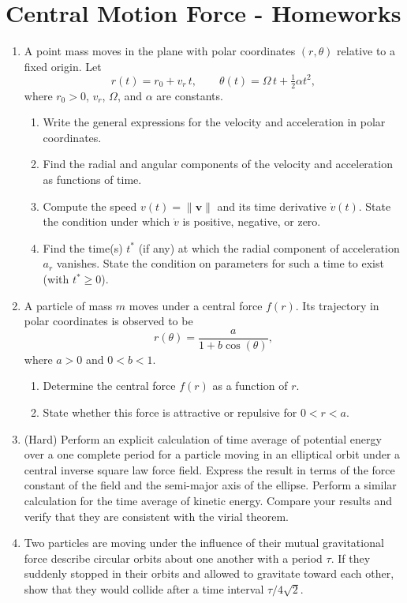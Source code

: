 \documentclass[../main.tex]{subfiles}
\begin{document}
\section{Central Motion Force - Homeworks}
\begin{enumerate}
\item A point mass moves in the plane with polar coordinates $(r,\theta)$ relative to a fixed origin. Let
\[
r(t)=r_0+v_r\,t,\qquad \theta(t)=\Omega\,t+\tfrac{1}{2}\alpha t^2,
\]
where \(r_0>0\), \(v_r\), \(\Omega\), and \(\alpha\) are constants. 

\begin{enumerate}
  \item[(a)] Write the general expressions for the velocity and acceleration in polar coordinates.
  \item[(b)] Find the radial and angular components of the velocity and acceleration as functions of time.
  \item[(c)] Compute the speed \(v(t)=\|\mathbf v\|\) and its time derivative \(\dot v(t)\). State the condition under which \(\dot v\) is positive, negative, or zero.

  \item[(d)] Find the time(s) \(t^\ast\) (if any) at which the radial component of acceleration \(a_r\) vanishes. State the condition on parameters for such a time to exist (with \(t^\ast\ge 0\)).
\end{enumerate}
\item     A particle of mass $m$ moves under a central force $f(r)$.  
    Its trajectory in polar coordinates is observed to be
    \[
        r(\theta)=\frac{a}{1+b\cos(\theta)},
    \]
    where $a>0$ and $0<b<1$. 

    \begin{enumerate}
        \item Determine the central force $f(r)$ as a function of $r$.
        \item State whether this force is attractive or repulsive for $0<r<a$.
    \end{enumerate} 

    \item (Hard) Perform an explicit calculation of time average of potential energy over a one complete period for a particle moving in an elliptical orbit under a central inverse square law force field. Express the result in terms of the force constant of the field and the semi-major axis of the ellipse. Perform a similar calculation for the time average of kinetic energy. Compare your results and verify that they are consistent with the virial theorem.
    \item Two particles are moving under the influence of their mutual gravitational force describe circular orbits about one another with a period $\tau$. If they suddenly stopped in their orbits and allowed to gravitate toward each other, show that they would collide after a time interval $\tau/4\sqrt{2}$.


\end{enumerate}
\end{document}
